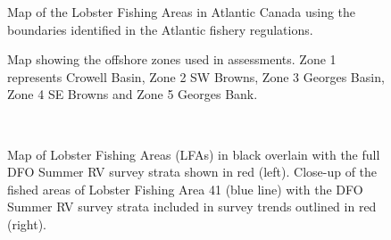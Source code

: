 \documentclass[11pt]{article}
\newcommand{\D}{.}
\newcommand{\e}{/backup/bio_data/bio.lobster/figures/} %
\begin{document}
\begin{landscape}
\begin{figure}
\centering
    \caption{Map of the Lobster Fishing Areas in Atlantic Canada using the boundaries identified in the Atlantic fishery regulations.}

\end{figure}
\end{landscape}



\begin{figure}
\centering
    \caption{Map showing the offshore zones used in assessments. Zone 1 represents Crowell Basin, Zone 2 SW Browns, Zone 3 Georges Basin, Zone 4 SE Browns and Zone 5 Georges Bank. 
}

\end{figure}

\begin{landscape}

\begin{figure}
\centering
{}\\
\caption{ Map of Lobster Fishing Areas (LFAs) in black overlain with the full DFO Summer RV survey strata shown in red (left). Close-up of the fished areas of Lobster Fishing Area 41 (blue line) with the DFO Summer RV survey strata included in survey trends outlined in red (right).}
\end{figure}

\end{landscape}
\end{document}
